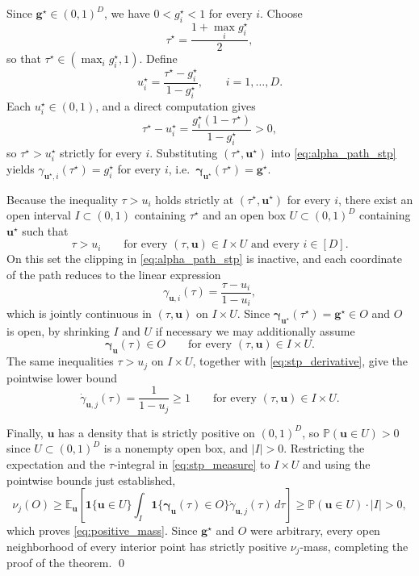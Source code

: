 Since $\mathbf{g}^{\star}\in(0,1)^D$, we have $0<g_i^{\star}<1$ for every $i$. Choose
\begin{equation}
\tau^{\star}=\frac{1+\max_i g_i^{\star}}{2},
\label{eq:tau_star_def}
\end{equation}
so that $\tau^{\star}\in(\max_i g_i^{\star},1)$. Define
\begin{equation}
u_i^{\star}=\frac{\tau^{\star}-g_i^{\star}}{1-g_i^{\star}},
\qquad i=1,\dots,D.
\label{eq:u_star_def}
\end{equation}
Each $u_i^{\star}\in(0,1)$, and a direct computation gives
\[
\tau^{\star}-u_i^{\star}
=\frac{g_i^{\star}(1-\tau^{\star})}{1-g_i^{\star}}>0,
\]
so $\tau^{\star}>u_i^{\star}$ strictly for every $i$. Substituting $(\tau^{\star},\mathbf{u}^{\star})$ into \eqref{eq:alpha_path_stp} yields $\gamma_{\mathbf{u}^{\star},i}(\tau^{\star})=g_i^{\star}$ for every $i$, i.e.\ $\boldsymbol{\gamma}_{\mathbf{u}^{\star}}(\tau^{\star})=\mathbf{g}^{\star}$.

Because the inequality $\tau>u_i$ holds strictly at $(\tau^{\star},\mathbf{u}^{\star})$ for every $i$, there exist an open interval $I\subset(0,1)$ containing $\tau^{\star}$ and an open box $U\subset(0,1)^D$ containing $\mathbf{u}^{\star}$ such that
\[
\tau>u_i
\qquad
\text{for every }(\tau,\mathbf{u})\in I\times U\text{ and every }i\in[D].
\]
On this set the clipping in \eqref{eq:alpha_path_stp} is inactive, and each coordinate of the path reduces to the linear expression
\[
\gamma_{\mathbf{u},i}(\tau)=\frac{\tau-u_i}{1-u_i},
\]
which is jointly continuous in $(\tau,\mathbf{u})$ on $I\times U$. Since $\boldsymbol{\gamma}_{\mathbf{u}^{\star}}(\tau^{\star})=\mathbf{g}^{\star}\in O$ and $O$ is open, by shrinking $I$ and $U$ if necessary we may additionally assume
\[
\boldsymbol{\gamma}_{\mathbf{u}}(\tau)\in O
\qquad
\text{for every }(\tau,\mathbf{u})\in I\times U.
\]
The same inequalities $\tau>u_j$ on $I\times U$, together with \eqref{eq:stp_derivative}, give the pointwise lower bound
\[
\dot{\gamma}_{\mathbf{u},j}(\tau)=\frac{1}{1-u_j}\ge 1
\qquad
\text{for every }(\tau,\mathbf{u})\in I\times U.
\]

Finally, $\mathbf{u}$ has a density that is strictly positive on $(0,1)^D$, so $\mathbb{P}(\mathbf{u}\in U)>0$ since $U\subset(0,1)^D$ is a nonempty open box, and $|I|>0$. Restricting the expectation and the $\tau$-integral in \eqref{eq:stp_measure} to $I\times U$ and using the pointwise bounds just established,
\[
\nu_j(O)
\ge
\mathbb{E}_{\mathbf{u}}\!\left[
\mathbf{1}\{\mathbf{u}\in U\}
\int_I
\mathbf{1}\{\boldsymbol{\gamma}_{\mathbf{u}}(\tau)\in O\}
\dot{\gamma}_{\mathbf{u},j}(\tau)\,d\tau
\right]
\ge
\mathbb{P}(\mathbf{u}\in U)\cdot|I|>0,
\]
which proves \eqref{eq:positive_mass}. Since $\mathbf{g}^{\star}$ and $O$ were arbitrary, every open neighborhood of every interior point has strictly positive $\nu_j$-mass, completing the proof of the theorem. \qed

